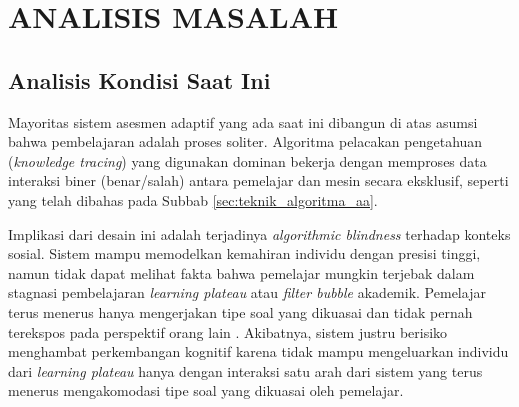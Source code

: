 
\chapter{ANALISIS MASALAH}
\label{chap:analisis-masalah}
\section{Analisis Kondisi Saat Ini}
\label{sec:kondisi_saat_ini}


Mayoritas sistem asesmen adaptif yang ada saat ini dibangun di atas asumsi bahwa pembelajaran adalah proses soliter. Algoritma pelacakan pengetahuan (\textit{knowledge tracing}) yang digunakan dominan bekerja dengan memproses data interaksi biner (benar/salah) antara pemelajar dan mesin secara eksklusif, seperti yang telah dibahas pada Subbab \ref{sec:teknik_algoritma_aa}.

Implikasi dari desain ini adalah terjadinya \textit{algorithmic blindness} terhadap konteks sosial. Sistem mampu memodelkan kemahiran individu dengan presisi tinggi, namun tidak dapat melihat fakta bahwa pemelajar mungkin terjebak dalam stagnasi pembelajaran \textit{learning plateau} atau \textit{filter bubble} akademik. Pemelajar terus menerus hanya mengerjakan tipe soal yang dikuasai dan tidak pernah terekspos pada perspektif orang lain \autocite{Halkiopoulos2024}. Akibatnya, sistem justru berisiko menghambat perkembangan kognitif karena tidak mampu mengeluarkan individu dari \textit{learning plateau} hanya dengan interaksi satu arah dari sistem yang terus menerus mengakomodasi tipe soal yang dikuasai oleh pemelajar.


